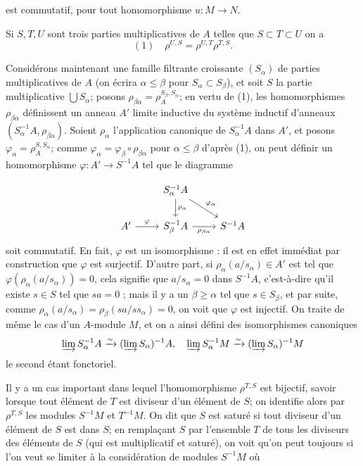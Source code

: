 \newpage


est commutatif, pour tout homomorphisme $u: M \to N$.

Si $S, T, U$ sont trois parties multiplicatives de $A$ telles que $S \subset T \subset U$ on a
$$(1) \quad \rho^{U,S} = \rho^{U,T} \rho^{T,S}.$$

Considérons maintenant une famille filtrante croissante $(S_\alpha)$ de parties multiplicatives de $A$ (on écrira $\alpha \leq \beta$ pour $S_\alpha \subset S_\beta$), et soit $S$ la partie multiplicative $\bigcup S_\alpha$; posons $\rho_{\beta\alpha} = \rho_A^{S_\beta, S_\alpha}$; en vertu de (1), les homomorphismes $\rho_{\beta\alpha}$ définissent un anneau $A'$ limite inductive du système inductif d'anneaux $(S_\alpha^{-1}A, \rho_{\beta\alpha})$. Soient $\rho_\alpha$ l'application canonique de $S_\alpha^{-1}A$ dans $A'$, et posons $\varphi_\alpha = \rho_A^{S, S_\alpha}$; comme $\varphi_\alpha = \varphi_\beta \circ \rho_{\beta\alpha}$ pour $\alpha \leq \beta$ d'après (1), on peut définir un homomorphisme $\varphi: A' \to S^{-1}A$ tel que le diagramme

$$\begin{tikzcd}
& S_\alpha^{-1}A \arrow[d, "\rho_\alpha"] \arrow[dr, "\varphi_\alpha"] & \\
A' \arrow[r, "\varphi"] & S_\beta^{-1}A \arrow[r, "\rho_{\beta\alpha}"'] & S^{-1}A
\end{tikzcd}$$
soit commutatif. En fait, $\varphi$ est un isomorphisme : il est en effet immédiat par construction que $\varphi$ est surjectif. D'autre part, si $\rho_\alpha(a/s_\alpha) \in A'$ est tel que $\varphi(\rho_\alpha(a/s_\alpha)) = 0$, cela signifie que $a/s_\alpha = 0$ dans $S^{-1}A$, c'est-à-dire qu'il existe $s \in S$ tel que $sa = 0$ ; mais il y a un $\beta \geq \alpha$ tel que $s \in S_\beta$, et par suite, comme $\rho_\alpha(a/s_\alpha) = \rho_\beta(sa/ss_\alpha) = 0$, on voit que $\varphi$ est injectif. On traite de même le cas d'un $A$-module $M$, et on a ainsi défini des isomorphismes canoniques
$$\varinjlim S_\alpha^{-1}A \xrightarrow{\sim} (\varinjlim S_\alpha)^{-1}A, \quad \varinjlim S_\alpha^{-1}M \xrightarrow{\sim} (\varinjlim S_\alpha)^{-1}M$$
le second étant fonctoriel.

Il y a un cas important dans lequel l'homomorphisme $\rho^{T,S}$ est bijectif, savoir lorsque tout élément de $T$ est diviseur d'un élément de $S$; on identifie alors par $\rho^{T,S}$ les modules $S^{-1}M$ et $T^{-1}M$. On dit que $S$ est saturé si tout diviseur d'un élément de $S$ est dans $S$; en remplaçant $S$ par l'ensemble $T$ de tous les diviseurs des éléments de $S$ (qui est multiplicatif et saturé), on voit qu'on peut toujours si l'on veut se limiter à la considération de modules $S^{-1}M$ où


